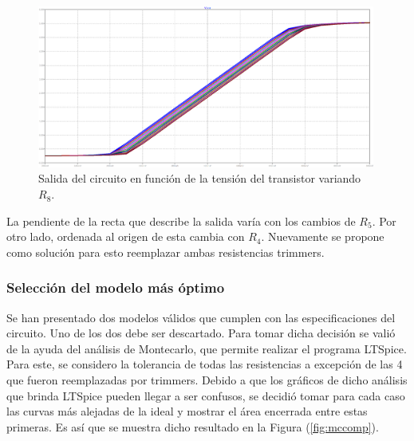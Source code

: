\documentclass[a4paper]{article}
\begin{document}
\begin{figure}[H]
	\centering
	\includegraphics[width=0.99\textwidth]{Ejercicio6/Imagenes/StepR8-M2.png}
	\caption{Salida del circuito en función de la tensión del transistor variando $R_8$.}
	\label{fig:r8-M2}
\end{figure}

La pendiente de la recta que describe la salida varía con los cambios de $R_5$. Por otro lado, ordenada al origen de esta cambia con $R_4$. Nuevamente se propone como solución para esto reemplazar ambas resistencias trimmers.

\subsubsection{Selección del modelo más óptimo}

Se han presentado dos modelos válidos que cumplen con las especificaciones del circuito. Uno de los dos debe ser descartado. Para tomar dicha decisión se valió de la ayuda del análisis de Montecarlo, que permite realizar el programa LTSpice. Para este, se considero la tolerancia de todas las resistencias a excepción de las 4 que fueron reemplazadas por trimmers. Debido a que los gráficos de dicho análisis que brinda LTSpice pueden llegar a ser confusos, se decidió tomar para cada caso las curvas más alejadas de la ideal y mostrar el área encerrada entre estas primeras. Es así que se muestra dicho resultado en la Figura (\ref{fig:mccomp}). 
\end{document}
